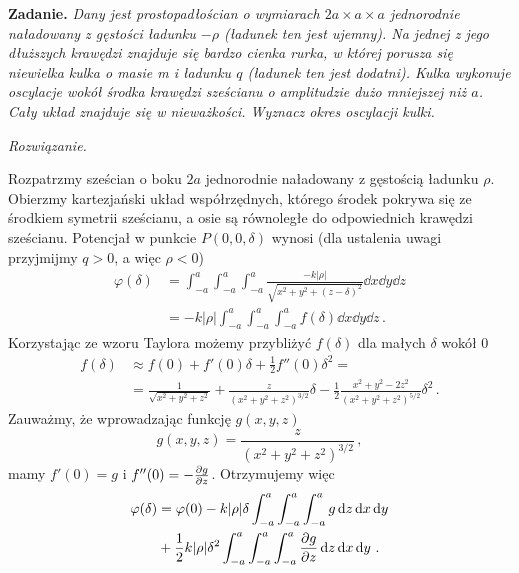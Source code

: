 \documentclass[../main.tex]{subfiles}
\begin{document}
\textbf{Zadanie.} \textit{Dany jest prostopadłościan o wymiarach \(2a \times a \times a\)
jednorodnie naładowany z gęstości ładunku \(-\rho\) (ładunek ten jest ujemny). Na jednej z jego
dłuższych krawędzi znajduje się bardzo cienka rurka, w której porusza się niewielka kulka o masie m
i ładunku \(q\) (ładunek ten jest dodatni). Kulka wykonuje oscylacje wokół środka krawędzi sześcianu
o amplitudzie dużo mniejszej niż \(a\). Cały układ znajduje się w nieważkości. Wyznacz okres
oscylacji kulki.}
\medskip

\textit{Rozwiązanie.}
\medskip

Rozpatrzmy sześcian o boku \(2a\) jednorodnie naładowany z gęstością ładunku \(\rho\). Obierzmy
kartezjański układ współrzędnych, którego środek pokrywa się ze środkiem symetrii sześcianu, a osie
są równoległe do odpowiednich krawędzi sześcianu. Potencjał w punkcie \(P(0,0,\delta)\) wynosi (dla
ustalenia uwagi przyjmijmy \(q>0\), a więc \(\rho<0\))
\begin{equation*}
\begin{split}
    \varphi(\delta)&=\int_{-a}^a\int_{-a}^a\int_{-a}^a\frac{-k|\rho|}{\sqrt{x^2+y^2+(z-\delta)^2}}\dd{x}\dd{y}\dd{z}\\
    &=-k|\rho| \int_{-a}^a\int_{-a}^a\int_{-a}^a f(\delta)\dd{x}\dd{y}\dd{z}\,.
\end{split}
\end{equation*}
Korzystając ze wzoru Taylora możemy przybliżyć \(f(\delta)\) dla małych \(\delta\) wokół 0
\begin{equation*}
\begin{split}
    f(\delta)&\approx f(0)+f'(0)\delta+\frac{1}{2}f''(0)\delta^2=\\
    &=\frac{1}{\sqrt{x^2+y^2+z^2}}+\frac{z}{(x^2+y^2+z^2)^{3/2}}\delta-\frac{1}{2}\frac{x^2+y^2-2z^2}{(x^2+y^2+z^2)^{5/2}}\delta^2\,.
\end{split}
\end{equation*}
Zauważmy, że wprowadzając funkcję \(g(x,y,z)\) 
\begin{equation*}
    g(x,y,z)=\frac{z}{(x^2+y^2+z^2)^{3/2}}\,,
\end{equation*}
mamy \(f'(0)=g\) i \(f''(0)=-\pdv{g}{z}\). Otrzymujemy więc
\begin{equation*}
\begin{split}
    \varphi(\delta)&=\varphi(0)-k|\rho|\delta \int_{-a}^a\int_{-a}^a\int_{-a}^ag \dd{z}\dd{x}\dd{y}\\
    &+\frac{1}{2}k|\rho|\delta^2\int_{-a}^a\int_{-a}^a\int_{-a}^a\pdv{g}{z}\dd{z}\dd{x}\dd{y}\,.
\end{split}
\end{equation*}
\end{document}

